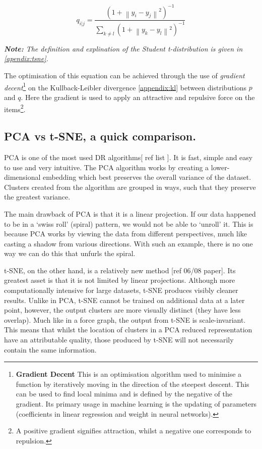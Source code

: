 \begin{equation}
q_{i|j} =\frac{(1 + \left \| y_i - y_j \right \|^2 )^{-1}}{\sum_{k \neq l} (1 + \left \| y_k - y_l \right \|^2 )^{-1} }
\end{equation}

\emph{\textbf{Note:} The definition and explination of the Student t-distribution is given in \autoref{apendix:tsne}.
}

The optimisation of this equation can be achieved through the use of \emph{gradient decent}\footnote{\textbf{Gradient Decent}
This is an optimisation algorithm used to minimise a function by iteratively moving in the direction of the steepest descent. This can be used to find local minima and is defined by the negative of the gradient. Its primary usage in machine learning is the updating of parameters (coefficients in linear regression and weight in neural networks).}
 on the Kullback-Leibler divergence \autoref{appendix:kl} between distributions $p$ and $q$. Here the gradient is used to apply an attractive and repulsive force on the items\footnote{A positive gradient signifies attraction, whilst a negative one corresponds to repulsion.}.




\subsection{PCA vs t-SNE, a quick comparison.}

PCA is one of the most used DR algorithms[ ref list ]. It is fast, simple and easy to use and very intuitive. The PCA algorithm works by creating a lower-dimensional embedding which best preserves the overall variance of the dataset. Clusters created from the algorithm are grouped in ways, such that they preserve the greatest variance.

The main drawback of PCA is that it is a linear projection. If our data happened to be in a `swiss roll' (spiral) pattern, we would not be able to `unroll' it. This is because PCA works by viewing the data from different perspectives, much like casting a shadow from various directions. With such an example, there is no one way we can do this that unfurls the spiral.

t-SNE, on the other hand, is a relatively new method [ref 06/08 paper]. Its greatest asset is that it is not limited by linear projections. Although more computationally intensive for large datasets, t-SNE produces visibly cleaner results. Unlike in PCA, t-SNE cannot be trained on additional data at a later point, however, the output clusters are more visually distinct (they have less overlap). Much like in a force graph, the output from t-SNE is scale-invariant. This means that whilst the location of clusters in a PCA reduced representation have an attributable quality, those produced by t-SNE will not necessarily contain the same information.

